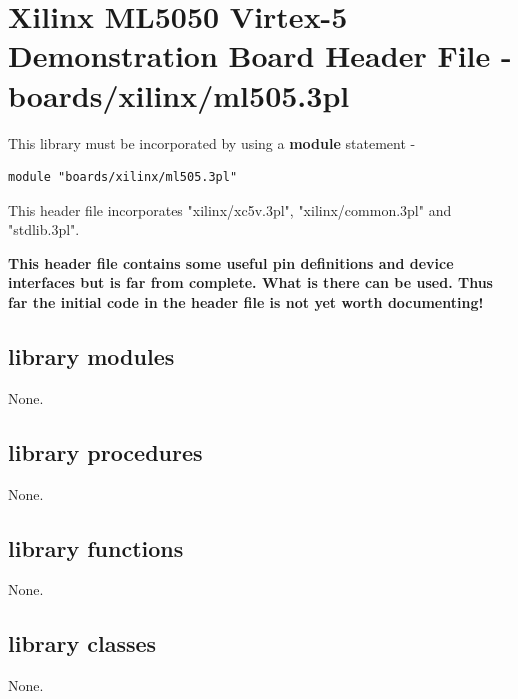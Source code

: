 \pagebreak

\section{Xilinx ML5050 Virtex-5 Demonstration Board Header File - boards/xilinx/ml505.3pl}

    
    This library must be incorporated by using a {\bf module} statement -
    \begin{lstlisting}[gobble=4, language=threepl]
       module "boards/xilinx/ml505.3pl"
    \end{lstlisting}
    
    This header file incorporates "xilinx/xc5v.3pl", "xilinx/common.3pl" and
    "stdlib.3pl".
    
    {\bf This header file contains some useful pin definitions and device
    interfaces but is far from complete. What is there can be used. Thus far
    the initial code in the header file is not yet worth documenting!}


    \subsection{library modules}
    
        None.




    \subsection{library procedures}
    
        None.
        


    \subsection{library functions}
    
        None.


    \subsection{library classes}
    
        None.
